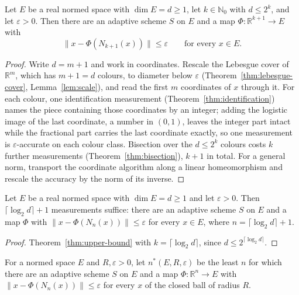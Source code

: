 \begin{theorem}
\label{thm:upper-bound}
\leanok
{}
Let $E$ be a real normed space with $\dim E = d \ge 1$, let $k \in \mathbb{N}_0$ with
$d \le 2^k$, and let $\varepsilon > 0$. Then there are an adaptive scheme $S$ on $E$ and
a map $\Phi : \mathbb{R}^{k+1} \to E$ with
\[
  \| x - \Phi( N_{k+1}(x) ) \| \le \varepsilon
  \qquad \text{for every } x \in E .
\]
\end{theorem}
\begin{proof}
\leanok
{}
Write $d = m + 1$ and work in coordinates. Rescale the Lebesgue cover of
$\mathbb{R}^m$, which has $m + 1 = d$ colours, to diameter below $\varepsilon$
(Theorem~\ref{thm:lebesgue-cover}, Lemma~\ref{lem:scale}), and read the first $m$
coordinates of $x$ through it. For each colour, one identification measurement
(Theorem~\ref{thm:identification}) names the piece containing those coordinates by an
integer; adding the logistic image of the last coordinate, a number in $(0,1)$, leaves
the integer part intact while the fractional part carries the last coordinate exactly,
so one measurement is $\varepsilon$-accurate on each colour class. Bisection over the
$d \le 2^k$ colours costs $k$ further measurements (Theorem~\ref{thm:bisection}),
$k + 1$ in total. For a general norm, transport the coordinate algorithm along a linear
homeomorphism and rescale the accuracy by the norm of its inverse.
\end{proof}

\begin{corollary}
\label{cor:upper-bound-clog}
\leanok
Let $E$ be a real normed space with $\dim E = d \ge 1$ and let $\varepsilon > 0$. Then
$\lceil \log_2 d \rceil + 1$ measurements suffice: there are an adaptive scheme $S$ on
$E$ and a map $\Phi$ with $\| x - \Phi( N_n(x) ) \| \le \varepsilon$ for every
$x \in E$, where $n = \lceil \log_2 d \rceil + 1$.
\end{corollary}
\begin{proof}
\leanok
{}
Theorem~\ref{thm:upper-bound} with $k = \lceil \log_2 d \rceil$, since
$d \le 2^{\lceil \log_2 d \rceil}$.
\end{proof}

\begin{definition}
\label{def:min-measurements}
\leanok
{}
For a normed space $E$ and $R, \varepsilon > 0$, let $n^*(E, R, \varepsilon)$ be the
least $n$ for which there are an adaptive scheme $S$ on $E$ and a map
$\Phi : \mathbb{R}^n \to E$ with
$\|x - \Phi(N_n(x))\| \le \varepsilon$ for every $x$ of the closed ball of radius $R$.
\end{definition}


